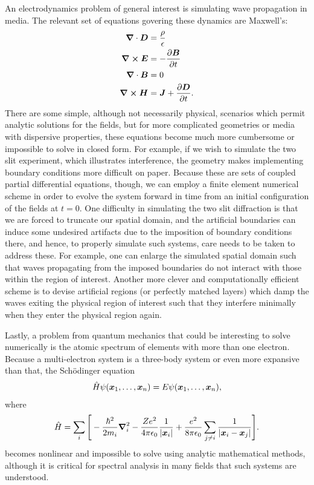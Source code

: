 {An electrodynamics problem of general interest is simulating wave propagation in media.
The relevant set of equations govering these dynamics are Maxwell's:
\begin{align}
    \grad \cdot \vb*{D} &= \frac{\rho}{\epsilon} \\
    \grad \cross \vb*{E} &= -\pdv{\vb*{B}}{t} \\
    \grad \cdot \vb*{B} &= 0 \\
    \grad \cross \vb*{H} &= \vb*{J} + \pdv{\vb*{D}}{t}
.\end{align}
There are some simple, although not necessarily physical, scenarios which permit analytic solutions for the fields, but for more complicated geometries or media with dispersive properties, these equations become much more cumbersome or impossible to solve in closed form.
For example, if we wish to simulate the two slit experiment, which illustrates interference, the geometry makes implementing boundary conditions more difficult on paper.
Because these are sets of coupled partial differential equations, though, we can employ a finite element numerical scheme in order to evolve the system forward in time from an initial configuration of the fields at $t = 0$.
One difficulty in simulating the two slit diffraction is that we are forced to truncate our spatial domain, and the artificial boundaries can induce some undesired artifacts due to the imposition of boundary conditions there, and hence, to properly simulate such systems, care needs to be taken to address these.
For example, one can enlarge the simulated spatial domain such that waves propagating from the imposed boundaries do not interact with those within the region of interest.
Another more clever and computationally efficient scheme is to devise artificial regions (or perfectly matched layers) which damp the waves exiting the physical region of interest such that they interfere minimally when they enter the physical region again.

Lastly, a problem from quantum mechanics that could be interesting to solve numerically is the atomic spectrum of elements with more than one electron.
Because a multi-electron system is a three-body system or even more expansive than that, the Sch\"{o}dinger equation
\begin{align}
\hat{H} \psi(\vb*{x}_{1},\ldots,\vb*{x}_{n})= E \psi(\vb*{x}_{1},\ldots,\vb*{x}_{n})
,\end{align}
where
\begin{align}
    \hat{H} = \sum_{i} \Bigg[ -\frac{\hbar^2}{2m_{i}} \grad_{i}^2 - \frac{Z e^2}{4 \pi \epsilon_0} \frac{1}{|\vb*{x}_{i}|} + \frac{e^2}{8 \pi \epsilon_0} \sum_{j \ne i} \frac{1}{|\vb*{x}_{i} - \vb*{x}_{j}|} \Bigg]
.\end{align}
becomes nonlinear and impossible to solve using analytic mathematical methods, although it is critical for spectral analysis in many fields that such systems are understood.

}


